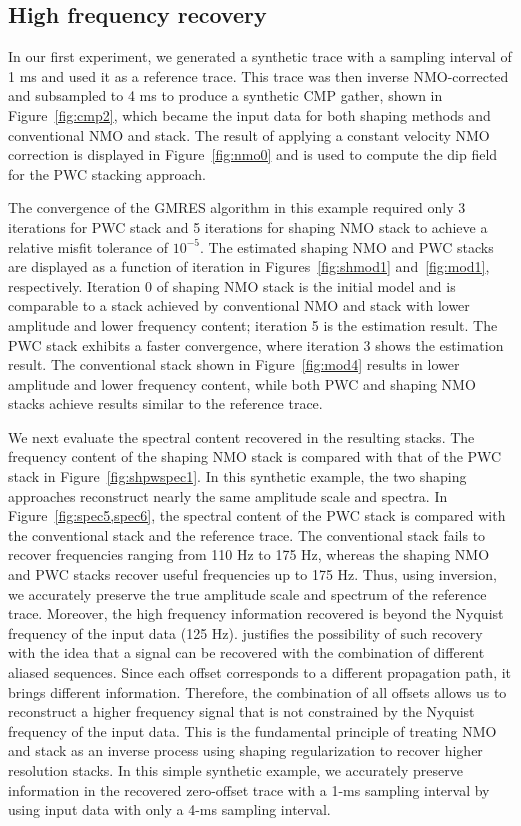 \subsection{High frequency recovery}
In our first experiment, we generated a synthetic trace with a sampling interval of 1 ms and 
used it as a reference trace. This trace was then inverse NMO-corrected and subsampled to 4 ms 
to produce a synthetic CMP gather, shown in Figure~\ref{fig:cmp2}, which became the input data for both 
shaping methods and conventional NMO and stack. The result of applying a constant velocity NMO 
correction is displayed in Figure~\ref{fig:nmo0} and is used to compute
the dip field for the PWC stacking approach.

The convergence of the GMRES algorithm in this example required only 3 iterations for PWC stack and 5 iterations for 
shaping NMO stack to achieve a relative misfit tolerance of $10^{-5}$.
The estimated shaping NMO and PWC stacks are displayed as a function of iteration in Figures~\ref{fig:shmod1} and~\ref{fig:mod1}, respectively.
Iteration 0 of shaping NMO stack is the initial model and is comparable to a stack achieved by conventional NMO and stack 
with lower amplitude and lower frequency content; iteration 5 is the estimation result. The PWC stack 
exhibits a faster convergence, where iteration 3 shows the estimation result. The conventional stack shown in Figure~\ref{fig:mod4}
results in lower amplitude and lower frequency content, while both PWC and shaping NMO stacks achieve results similar to the 
reference trace.

We next evaluate the spectral content recovered in the resulting stacks. The frequency content of the shaping NMO stack is compared
with that of the PWC stack in Figure~\ref{fig:shpwspec1}. 
In this synthetic example, the two shaping approaches reconstruct nearly the same amplitude scale and spectra. In Figure~\ref{fig:spec5,spec6},
the spectral content of the PWC stack is compared with the conventional stack and the reference 
trace. The conventional stack fails to recover frequencies ranging 
from 110 Hz to 175 Hz, whereas the shaping NMO and PWC stacks recover useful frequencies up to 175 Hz. Thus, using inversion, we 
accurately preserve the true amplitude scale and spectrum of the reference trace.
Moreover, the high frequency information recovered is beyond
the Nyquist frequency of the input data (125 Hz). \cite{ronen2} justifies the possibility of such recovery with the
idea that a signal can be recovered with the combination of different aliased sequences. Since each offset
corresponds to a different propagation path, it brings different information. Therefore,
the combination of all offsets allows us to reconstruct a higher frequency signal that is not constrained
by the Nyquist frequency of the input data. This is the fundamental principle of treating NMO and stack as an 
inverse process using shaping regularization to recover higher resolution stacks. In this simple synthetic example, 
we accurately preserve information in the recovered zero-offset trace with a 1-ms sampling 
interval by using input data with only a 4-ms sampling interval. 


